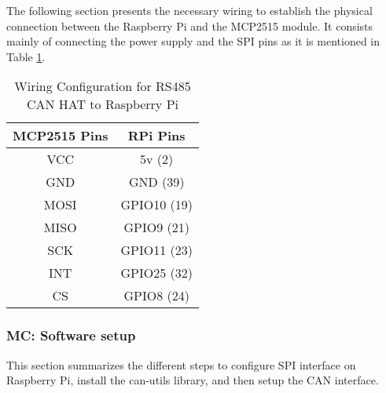 The following section presents the necessary wiring to establish the physical connection between the Raspberry Pi and the MCP2515 module. It consists mainly of connecting the power supply and the SPI pins as it is mentioned in Table \ref{tab wiring MC}.

\begin{table} [H]
\centering
\begin{tabular}{| c | c |} 
 \hline
 MCP2515 Pins & RPi Pins \\ [0.5ex] %
 \hline\hline
 VCC &  5v     (2)  \\ 
 \hline
 GND &  GND    (39) \\ %
 \hline
 MOSI & GPIO10 (19) \\
 \hline
 MISO & GPIO9  (21) \\
 \hline
 SCK &  GPIO11 (23)\\
 \hline
 INT &  GPIO25 (32) \\
 \hline
 CS &   GPIO8  (24) \\
 \hline
\end{tabular}
\caption{Wiring Configuration for RS485 CAN HAT to Raspberry Pi}
  \label{tab wiring MC}
\end{table}

\subsubsection{MC: Software setup}

This section summarizes the different steps to configure SPI interface on Raspberry Pi, install the can-utils library, and then setup the CAN interface.

